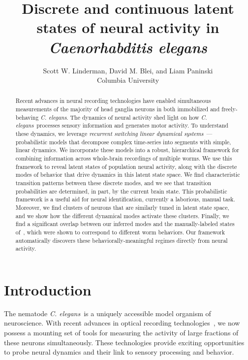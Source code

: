 \documentclass{article}
\title{Discrete and continuous latent states of neural activity in \textit{Caenorhabditis elegans}}
\author{Scott W. Linderman,
  David M. Blei,
  and
  Liam Paninski
  \\
  Columbia University
}
\newcommand{\celegans}{\textit{C. elegans}}
\begin{document}
\maketitle

\begin{abstract}
  Recent advances in neural recording technologies have enabled
  simultaneous measurements of the majority of head ganglia neurons in
  both immobilized and freely-behaving \celegans.  The dynamics of
  neural activity shed light on how \celegans~processes sensory
  information and generates motor activity.  To understand these
  dynamics, we leverage \emph{recurrent switching linear dynamical
    systems}~\citep{linderman2017recurrent}---probabilistic models
  that decompose complex time-series into segments with simple, linear
  dynamics. We incorporate these models into a robust, hierarchical
  framework for combining information across whole-brain recordings of
  multiple worms.  We use this framework to reveal latent states of
  population neural activity, along with the discrete modes of
  behavior that drive dynamics in this latent state space.  We find
  characteristic transition patterns between these discrete modes, and
  we see that transition probabilities are determined, in part, by the
  current brain state.  This probabilistic framework is a useful aid
  for neural identification, currently a laborious, manual task.
  Moreover, we find clusters of neurons that are similarly tuned in
  latent state space, and we show how the different dynamical modes
  activate these clusters.  Finally, we find a significant overlap
  between our inferred modes and the manually-labeled states
  of~\citet{kato2015global}, which were shown to correspond to
  different worm behaviors. Our framework automatically discovers
  these behaviorally-meaningful regimes directly from neural activity.
\end{abstract}

\section{Introduction}
The nematode \celegans~is a uniquely accessible model organism of
neuroscience. With recent advances in optical recording
technologies~\citep{schrodel2013brain, prevedel2014simultaneous,
  nguyen2016whole}, we now possess a mounting set of tools for
measuring the activity of large fractions of these neurons
simultaneously. These technologies provide exciting opportunities to
probe neural dynamics and their link to sensory
processing and behavior.
\end{document}
